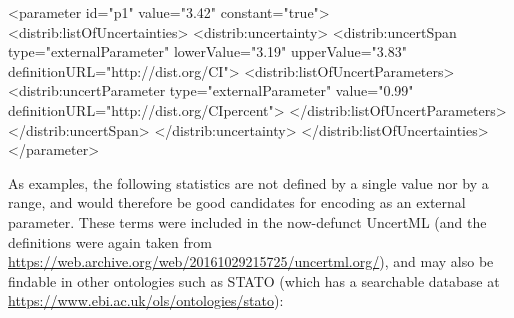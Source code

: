 \documentclass[draftspec]{sbmlpkgspec}
\begin{document}
\begin{blockChanged}
\begin{itemize}
\begin{example}
  <parameter id="p1" value="3.42" constant="true">
    <distrib:listOfUncertainties>
      <distrib:uncertainty>
        <distrib:uncertSpan type="externalParameter" lowerValue="3.19" upperValue="3.83"
                            definitionURL="http://dist.org/CI">
          <distrib:listOfUncertParameters>
            <distrib:uncertParameter type="externalParameter" value="0.99"
                            definitionURL="http://dist.org/CIpercent">
          </distrib:listOfUncertParameters>
        </distrib:uncertSpan>
      </distrib:uncertainty>
    </distrib:listOfUncertainties>
  </parameter>
\end{example}

\end{itemize}
\end{blockChanged}

As examples, the following statistics are not defined by a single value nor by a range, and would therefore be good candidates for encoding as an external parameter.  These terms were included in the now-defunct UncertML (and the definitions were again taken from \url{https://web.archive.org/web/20161029215725/uncertml.org/}), and may also be findable in other ontologies such as STATO (which has a searchable database at \url{https://www.ebi.ac.uk/ols/ontologies/stato}):
\end{document}
